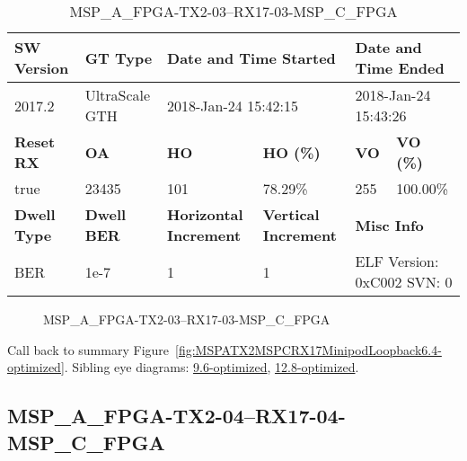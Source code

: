 \begin{table}[h]
\centering
\caption{MSP\_A\_FPGA-TX2-03--RX17-03-MSP\_C\_FPGA}
\label{tab:MSPAFPGATX203RX1703MSPCFPGA6.4-optimized}
\begin{tabular}{@{}|l|l|l|l|l|l|@{}}
\toprule
\textbf{SW Version}                & \textbf{GT Type}   & \multicolumn{2}{l|}{\textbf{Date and Time Started}}            & \multicolumn{2}{l|}{\textbf{Date and Time Ended}}        \\ \midrule
2017.2                       & UltraScale GTH          & \multicolumn{2}{l|}{2018-Jan-24 15:42:15}                   & \multicolumn{2}{l|}{2018-Jan-24 15:43:26}               \\ \midrule
\textbf{Reset RX}                  & \textbf{OA} & \textbf{HO}   & \textbf{HO (\%)} & \textbf{VO} & \textbf{VO (\%)} \\ \midrule
true & 23435        & 101          & 78.29\%        & 255        & 100.00\%       \\ \midrule
\textbf{Dwell Type}                & \textbf{Dwell BER} & \textbf{Horizontal Increment} & \textbf{Vertical Increment}    & \multicolumn{2}{l|}{\textbf{Misc Info}}                  \\ \midrule
BER                            & 1e-7        & 1        & 1           & \multicolumn{2}{l|}{ELF Version: 0xC002 SVN: 0}                         \\ \bottomrule
\end{tabular}
\end{table}

\begin{figure}[h]
\caption{MSP\_A\_FPGA-TX2-03--RX17-03-MSP\_C\_FPGA} \label{fig:MSPAFPGATX203RX1703MSPCFPGA6.4-optimized}
\end{figure}

Call back to summary Figure~\ref{fig:MSPATX2MSPCRX17MinipodLoopback6.4-optimized}.
Sibling eye diagrams: \hyperref[sec:MSPAFPGATX203RX1703MSPCFPGA9.6-optimized]{9.6-optimized}, \hyperref[sec:MSPAFPGATX203RX1703MSPCFPGA12.8-optimized]{12.8-optimized}.

\clearpage
\newpage


\subsection{MSP\_A\_FPGA-TX2-04--RX17-04-MSP\_C\_FPGA}\label{sec:MSPAFPGATX204RX1704MSPCFPGA6.4-optimized}

